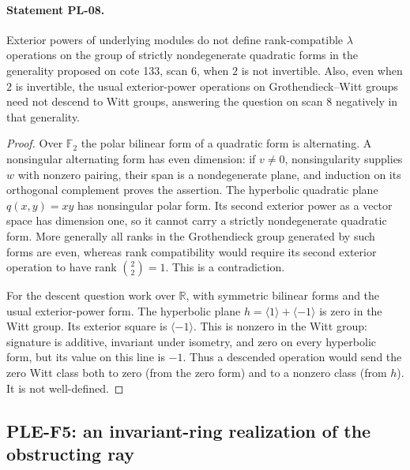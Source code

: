 \documentclass[11pt,a4paper]{article}
\begin{document}
\paragraph{Statement PL-08.}
Exterior powers of underlying modules do not define rank-compatible
$\lambda$ operations on the group of strictly nondegenerate quadratic forms
in the generality proposed on cote 133, scan 6, when $2$ is not invertible.
Also, even when $2$ is invertible, the usual exterior-power operations on
Grothendieck--Witt groups need not descend to Witt groups, answering the
question on scan 8 negatively in that generality.

\begin{proof}
Over $\mathbb F_2$ the polar bilinear form of a quadratic form is alternating.
A nonsingular alternating form has even dimension: if $v\ne0$,
nonsingularity supplies $w$ with nonzero pairing, their span is a
nondegenerate plane, and induction on its orthogonal complement proves
the assertion. The hyperbolic quadratic plane $q(x,y)=xy$ has nonsingular
polar form. Its second exterior power as a vector space has dimension one,
so it cannot carry a strictly nondegenerate quadratic form. More generally
all ranks in the Grothendieck group generated by such forms are even,
whereas rank compatibility would require its second exterior operation
to have rank $\binom22=1$. This is a contradiction.

For the descent question work over $\mathbb R$, with symmetric bilinear
forms and the usual exterior-power form. The hyperbolic plane
$h=\langle1\rangle+\langle-1\rangle$ is zero in the Witt group.
Its exterior square is $\langle-1\rangle$. This is nonzero in the Witt
group: signature is additive, invariant under isometry, and zero on every
hyperbolic form, but its value on this line is $-1$. Thus a descended
operation would send the zero Witt class both to zero (from the zero
form) and to a nonzero class (from $h$). It is not well-defined.
\end{proof}

\subsection{PLE-F5: an invariant-ring realization of the obstructing ray}
\end{document}
